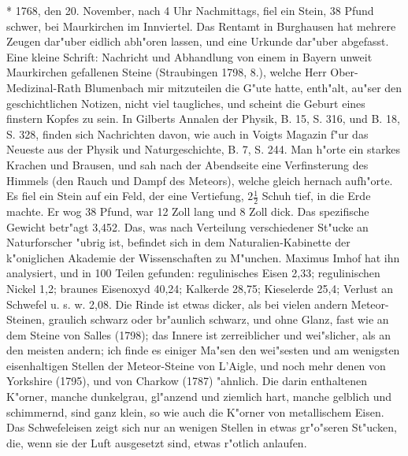 \documentclass[a4paper, 11pt, oneside, polutonikogreek, german]{article}
\begin{document}
* 1768, den 20. November, nach 4 Uhr Nachmittags, fiel ein Stein, 38 Pfund schwer, bei Maurkirchen im Innviertel. Das Rentamt in Burghausen hat mehrere Zeugen dar"uber eidlich abh"oren lassen, und eine Urkunde dar"uber abgefasst. Eine kleine Schrift: Nachricht und Abhandlung von einem in Bayern unweit Maurkirchen gefallenen Steine (Straubingen 1798, 8.), welche Herr Ober-Medizinal-Rath Blumenbach mir mitzuteilen die G"ute hatte, enth"alt, au"ser den geschichtlichen Notizen, nicht viel taugliches, und scheint die Geburt eines finstern Kopfes zu sein. In Gilberts Annalen der Physik, B. 15, S. 316, und B. 18, S. 328, finden sich Nachrichten davon, wie auch in Voigts Magazin f"ur das Neueste aus der Physik und Naturgeschichte, B. 7, S. 244. Man h"orte ein starkes Krachen und Brausen, und sah nach der Abendseite eine Verfinsterung des Himmels (den Rauch und Dampf des Meteors), welche gleich hernach aufh"orte. Es fiel ein Stein auf ein Feld, der eine Vertiefung, $\mathfrak{2\frac{1}{2}}$ Schuh tief, in die Erde machte. Er wog 38 Pfund, war 12 Zoll lang und 8 Zoll dick. Das spezifische Gewicht betr"agt 3,452. Das, was nach Verteilung verschiedener St"ucke an Naturforscher "ubrig ist, befindet sich in dem Naturalien-Kabinette der k"oniglichen Akademie der Wissenschaften zu M"unchen. Maximus Imhof hat ihn analysiert, und in 100 Teilen gefunden: regulinisches Eisen 2,33; regulinischen Nickel 1,2; braunes Eisenoxyd 40,24; Kalkerde 28,75; Kieselerde 25,4; Verlust an Schwefel u. s. w. 2,08. Die Rinde ist etwas dicker, als bei vielen andern Meteor-Steinen, graulich schwarz oder br"aunlich schwarz, und ohne Glanz, fast wie an dem Steine von Salles (1798); das Innere ist zerreiblicher und wei"slicher, als an den meisten andern; ich finde es einiger Ma"sen den wei"sesten und am wenigsten eisenhaltigen Stellen der Meteor-Steine von L'Aigle, und noch mehr denen von Yorkshire (1795), und von Charkow (1787) "ahnlich. Die darin enthaltenen K"orner, manche dunkelgrau, gl"anzend und ziemlich hart, manche gelblich und schimmernd, sind ganz klein, so wie auch die K"orner von metallischem Eisen. Das Schwefeleisen zeigt sich nur an wenigen Stellen in etwas gr"o"seren St"ucken, die, wenn sie der Luft ausgesetzt sind, etwas r"otlich anlaufen.
\end{document}
